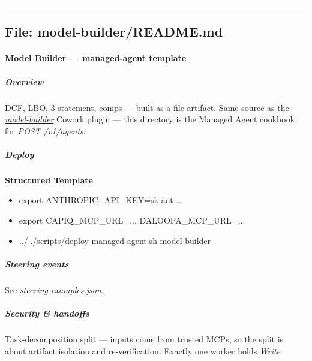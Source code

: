 \documentclass[11pt]{article}
\begin{document}
\vspace{0.8em}\hrule\vspace{0.8em}

\subsection{File: model-builder/README.md}\label{file:model-builder-README-md}

\paragraph{Model Builder — managed-agent template}\mbox{}\par

\subparagraph{Overview}\mbox{}\par

DCF, LBO, 3-statement, comps — built as a file artifact. Same source as the \href{../../plugins/agent-plugins/model-builder}{\emph{model-builder}} Cowork plugin — this directory is the Managed Agent cookbook for \emph{POST /v1/agents}.


\subparagraph{Deploy}\mbox{}\par

\textbf{Structured Template}
\begin{itemize}[leftmargin=*,itemsep=2pt,topsep=2pt]
\item {} export ANTHROPIC\_\allowbreak{}API\_\allowbreak{}KEY=sk-ant-...
\item {} export CAPIQ\_\allowbreak{}MCP\_\allowbreak{}URL=... DALOOPA\_\allowbreak{}MCP\_\allowbreak{}URL=...
\item {} ../../scripts/deploy-managed-agent.sh model-builder
\end{itemize}

\subparagraph{Steering events}\mbox{}\par

See \href{./steering-examples.json}{\emph{steering-examples.json}}.


\subparagraph{Security \& handoffs}\mbox{}\par

Task-decomposition split — inputs come from trusted MCPs, so the split is about artifact isolation and re-verification. Exactly one worker holds \emph{Write}:
\end{document}
